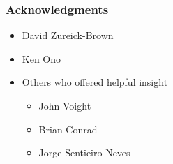 \documentclass{beamer}
\theoremstyle{remark}
\begin{document}

\begin{frame}
\frametitle{Acknowledgments}
\begin{itemize}
	\item David Zureick-Brown
	\item Ken Ono
	\item Others who offered helpful insight
	\begin{itemize}
		\item John Voight
		\item Brian Conrad
		\item Jorge Sentieiro Neves
	\end{itemize}
\end{itemize}
\end{frame}
\end{document}

